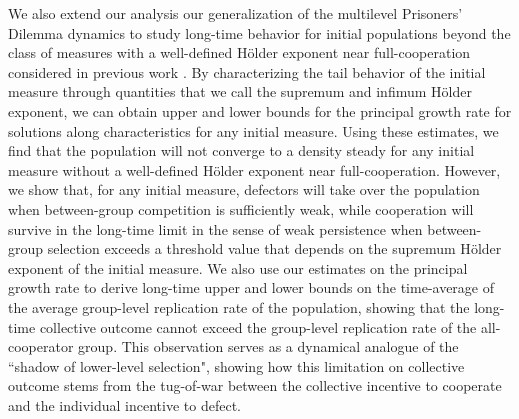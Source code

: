 \documentclass[11pt]{article}
\numberwithin{equation}{section}
\newcommand{\myindent}{\hspace{10mm}}
\begin{document}
{\myindent We also extend our analysis our generalization of the multilevel Prisoners' Dilemma dynamics to study long-time behavior for initial populations beyond the class of measures with a well-defined H{\"o}lder exponent near full-cooperation considered in previous work \cite{luo2017scaling,cooney2019replicator,cooney2020analysis}. By characterizing the tail behavior of the initial measure through quantities that we call the supremum and infimum H{\"o}lder exponent, we can obtain upper and lower bounds for the principal growth rate for solutions along characteristics for any initial measure. Using these estimates, we find that the population will not converge to a density steady for any initial measure without a well-defined H{\"o}lder exponent near full-cooperation. However, we show that, for any initial measure, defectors will take over the population when between-group competition is sufficiently weak, while cooperation will survive in the long-time limit in the sense of weak persistence when between-group selection exceeds a threshold value that depends on the supremum H{\"o}lder exponent of the initial measure. We also use our estimates on the principal growth rate to derive long-time upper and lower bounds on the time-average of the average group-level replication rate of the population, showing that the long-time collective outcome cannot exceed the group-level replication rate of the all-cooperator group. This observation serves as a dynamical analogue of the ``shadow of lower-level selection", showing how this limitation on collective outcome stems from the tug-of-war between the collective incentive to cooperate and the individual incentive to defect.

}
\end{document}
